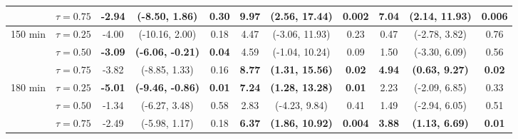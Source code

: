\begin{table}[ht]
{\begin{tabular}{llccccccccc}
 & $\tau=0.75$ & -2.94 & (-8.50, 1.86) & 0.30 & \textbf{9.97} & \textbf{(2.56, 17.44)} & \textbf{0.002} & \textbf{7.04} & \textbf{(2.14, 11.93)} & \textbf{0.006} \\
\midrule
\multirow{3}{*}{150 min} & $\tau=0.25$ & -4.00 & (-10.16, 2.00) & 0.18 & 4.47 & (-3.06, 11.93) & 0.23 & 0.47 & (-2.78, 3.82) & 0.76 \\
 & $\tau=0.50$ & \textbf{-3.09} & \textbf{(-6.06, -0.21)} & \textbf{0.04} & 4.59 & (-1.04, 10.24) & 0.09 & 1.50 & (-3.30, 6.09) & 0.56 \\
 & $\tau=0.75$ & -3.82 & (-8.85, 1.33) & 0.16 & \textbf{8.77} & \textbf{(1.31, 15.56)} & \textbf{0.02} & \textbf{4.94} & \textbf{(0.63, 9.27)} & \textbf{0.02} \\
\midrule
\multirow{3}{*}{180 min} & $\tau=0.25$ & \textbf{-5.01} & \textbf{(-9.46, -0.86)} & \textbf{0.01} & \textbf{7.24} & \textbf{(1.28, 13.28)} & \textbf{0.01} & 2.23 & (-2.09, 6.85) & 0.33 \\
 & $\tau=0.50$ & -1.34 & (-6.27, 3.48) & 0.58 & 2.83 & (-4.23, 9.84) & 0.41 & 1.49 & (-2.94, 6.05) & 0.51 \\
 & $\tau=0.75$ & -2.49 & (-5.98, 1.17) & 0.18 & \textbf{6.37} & \textbf{(1.86, 10.92)} & \textbf{0.004} & \textbf{3.88} & \textbf{(1.13, 6.69)} & \textbf{0.01} \\
\bottomrule
\end{tabular}%
}
\end{table}
